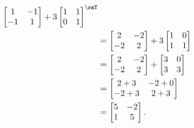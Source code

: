 \begin{questions}
\begin{solution}
\begin{align*}
\begin{bmatrix}
          1&-1\\
          -1&1
        \end{bmatrix}
       +3\begin{bmatrix}
         1&1\\
         0&1
       \end{bmatrix}^\rmT\\%
      &=
        \begin{bmatrix}
          2&-2\\
          -2&2
        \end{bmatrix}
      +3\begin{bmatrix}
        1&0\\
        1&1
      \end{bmatrix}\\
      &=\begin{bmatrix}
          2&-2\\
          -2&2
        \end{bmatrix}
      +\begin{bmatrix}
        3&0\\
        3&3
      \end{bmatrix}\\
      &=\begin{bmatrix}
        2+3&-2+0\\
        -2+3&2+3
      \end{bmatrix}\\
      &=\begin{bmatrix}
        5&-2\\
        1&5
      \end{bmatrix}.
    \end{align*}
  \end{solution}
\end{questions}


